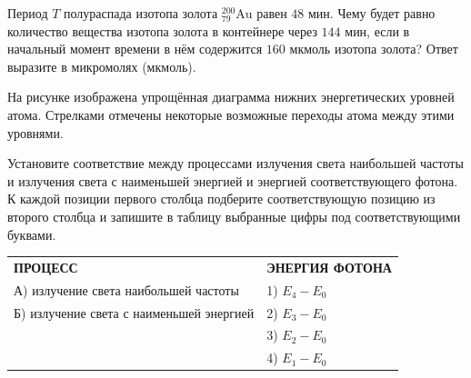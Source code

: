 \begin{taskbasic}[code={\label{task:nuclear_decay_gold_mcmol}}]
Период $T$ полураспада изотопа золота $^{200}_{79}\text{Au}$ равен $48\text{ мин}$. Чему будет равно количество вещества изотопа золота в контейнере через $144\text{ мин}$, если в начальный момент времени в нём содержится $160\text{ мкмоль}$ изотопа золота? Ответ выразите в микромолях (мкмоль).

\end{taskbasic}

\begin{taskbasic}[code={\label{task:atomic_levels_max_freq_min_energy}}]
На рисунке изображена упрощённая диаграмма нижних энергетических уровней атома. Стрелками отмечены некоторые возможные переходы атома между этими уровнями.

Установите соответствие между процессами излучения света наибольшей частоты и излучения света с наименьшей энергией и энергией соответствующего фотона. К каждой позиции первого столбца подберите соответствующую позицию из второго столбца и запишите в таблицу выбранные цифры под соответствующими буквами.

\nopagebreak\smallskip
\begin{center}
\end{center}

\smallskip
\begin{tabular}{p{}p{}}
\textbf{ПРОЦЕСС} & \textbf{ЭНЕРГИЯ ФОТОНА} \\
А) излучение света наибольшей частоты & 1) $E_4 - E_0$ \\
Б) излучение света с наименьшей энергией & 2) $E_3 - E_0$ \\
& 3) $E_2 - E_0$ \\
& 4) $E_1 - E_0$
\end{tabular}

\end{taskbasic}


